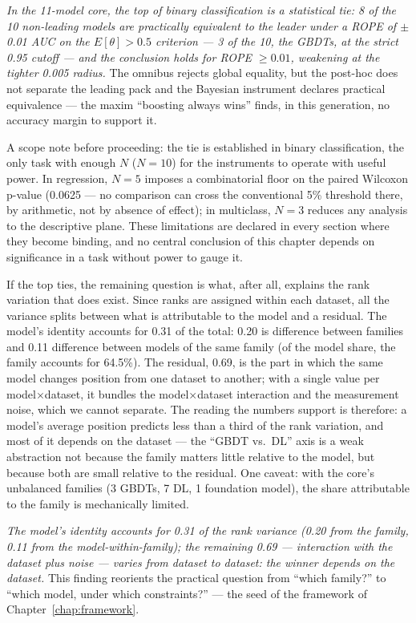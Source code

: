\emph{In the 11-model core, the top of binary classification is a
statistical tie: 8 of the 10 non-leading models are practically
equivalent to the leader under a ROPE of $\pm$0.01 AUC on the
$E[\theta]>0.5$ criterion --- 3 of the 10, the GBDTs, at the strict
0.95 cutoff --- and the conclusion holds for ROPE $\geq 0.01$,
weakening at the tighter 0.005 radius.} The omnibus rejects global equality, but the post-hoc
does not separate the leading pack and the Bayesian instrument
declares practical equivalence --- the maxim ``boosting always wins''
finds, in this generation, no accuracy margin to support it.

A scope note before proceeding: the tie is established in
binary classification, the only task with enough $N$ ($N{=}10$) for
the instruments to operate with useful power. In regression, $N{=}5$
imposes a combinatorial floor on the paired Wilcoxon p-value (0.0625
--- no comparison can cross the conventional 5\% threshold there, by
arithmetic, not by absence of effect); in multiclass, $N{=}3$ reduces
any analysis to the descriptive plane. These limitations are declared
in every section where they become binding, and no central conclusion
of this chapter depends on significance in a task without power to
gauge it.

If the top ties, the remaining question is what, after all, explains
the rank variation that does exist. Since ranks are assigned within
each dataset, all the variance splits between what is attributable to
the model and a residual. The model's identity accounts for 0.31 of
the total: 0.20 is difference between families and 0.11 difference
between models of the same family (of the model share, the family
accounts for 64.5\%). The residual, 0.69, is the part in which the
same model changes position from one dataset to another; with a
single value per model$\times$dataset, it bundles the
model$\times$dataset interaction and the measurement noise, which we
cannot separate. The reading the numbers support is therefore: a
model's average position predicts less than a third of the rank
variation, and most of it depends on the dataset --- the ``GBDT vs.\
DL'' axis is a weak abstraction not because the family matters little
relative to the model, but because both are small relative to the
residual. One caveat: with the core's unbalanced families (3 GBDTs, 7
DL, 1 foundation model), the share attributable to the family is
mechanically limited.

\emph{The model's identity accounts for 0.31 of the rank variance
(0.20 from the family, 0.11 from the model-within-family); the
remaining 0.69 --- interaction with the dataset plus noise --- varies
from dataset to dataset: the winner depends on the dataset.} This
finding reorients the practical question from ``which family?'' to
``which model, under which constraints?'' --- the seed of the
framework of Chapter~\ref{chap:framework}.

